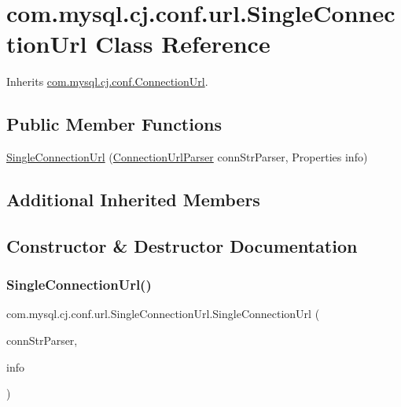 \hypertarget{classcom_1_1mysql_1_1cj_1_1conf_1_1url_1_1_single_connection_url}{}\section{com.\+mysql.\+cj.\+conf.\+url.\+Single\+Connection\+Url Class Reference}
\label{classcom_1_1mysql_1_1cj_1_1conf_1_1url_1_1_single_connection_url}


Inherits \mbox{\hyperlink{classcom_1_1mysql_1_1cj_1_1conf_1_1_connection_url}{com.\+mysql.\+cj.\+conf.\+Connection\+Url}}.

\subsection*{Public Member Functions}
\begin{DoxyCompactItemize}
\item 
\mbox{\hyperlink{classcom_1_1mysql_1_1cj_1_1conf_1_1url_1_1_single_connection_url_ab3e8d4be3ada04a11014021a83c18acb}{Single\+Connection\+Url}} (\mbox{\hyperlink{classcom_1_1mysql_1_1cj_1_1conf_1_1_connection_url_parser}{Connection\+Url\+Parser}} conn\+Str\+Parser, Properties info)
\end{DoxyCompactItemize}
\subsection*{Additional Inherited Members}


\subsection{Constructor \& Destructor Documentation}
\mbox{\label{classcom_1_1mysql_1_1cj_1_1conf_1_1url_1_1_single_connection_url_ab3e8d4be3ada04a11014021a83c18acb}} 
\subsubsection{\texorpdfstring{Single\+Connection\+Url()}{SingleConnectionUrl()}}
{\footnotesize\ttfamily com.\+mysql.\+cj.\+conf.\+url.\+Single\+Connection\+Url.\+Single\+Connection\+Url (\begin{DoxyParamCaption}\item[{\mbox{\hyperlink{classcom_1_1mysql_1_1cj_1_1conf_1_1_connection_url_parser}{Connection\+Url\+Parser}}}]{conn\+Str\+Parser,  }\item[{Properties}]{info }\end{DoxyParamCaption})}


